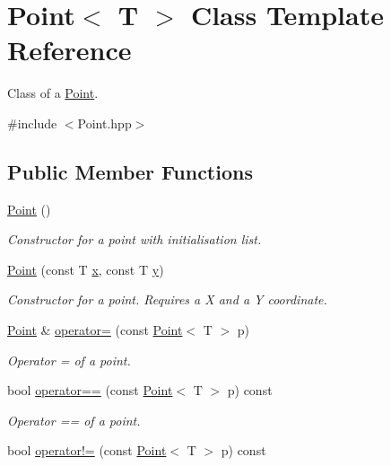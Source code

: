\hypertarget{classPoint}{}\section{Point$<$ T $>$ Class Template Reference}
\label{classPoint}


Class of a \hyperlink{classPoint}{Point}.  




{\ttfamily \#include $<$Point.\+hpp$>$}

\subsection*{Public Member Functions}
\begin{DoxyCompactItemize}
\item 
\mbox{\label{classPoint_aea76b1130f1a203722d8f2254ced8e66}} 
\hyperlink{classPoint_aea76b1130f1a203722d8f2254ced8e66}{Point} ()
\begin{DoxyCompactList}\small\item\em Constructor for a point with initialisation list. \end{DoxyCompactList}\item 
\hyperlink{classPoint_acfb36323391d7fe1e451137f8c39cde7}{Point} (const T \hyperlink{classPoint_a401d07562afaf0079121218025e66b76}{x}, const T \hyperlink{classPoint_a65146418a33ebb2cd9acb85cade60ac9}{y})
\begin{DoxyCompactList}\small\item\em Constructor for a point. Requires a X and a Y coordinate. \end{DoxyCompactList}\item 
\hyperlink{classPoint}{Point} \& \hyperlink{classPoint_a42cf65d5594e882fc05a25fb344618fb}{operator=} (const \hyperlink{classPoint}{Point}$<$ T $>$ p)
\begin{DoxyCompactList}\small\item\em Operator = of a point. \end{DoxyCompactList}\item 
bool \hyperlink{classPoint_a63bcffe1a385653e0dd7d3a39c06a631}{operator==} (const \hyperlink{classPoint}{Point}$<$ T $>$ p) const
\begin{DoxyCompactList}\small\item\em Operator == of a point. \end{DoxyCompactList}\item 
bool \hyperlink{classPoint_accaa0100c0c631ad03280446a0b05339}{operator!=} (const \hyperlink{classPoint}{Point}$<$ T $>$ p) const

\end{DoxyCompactItemize}
